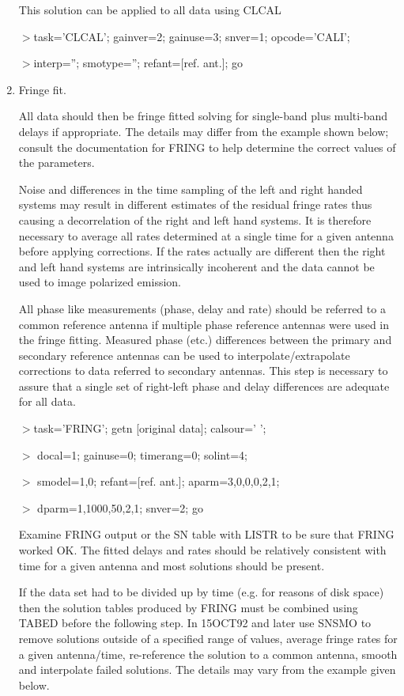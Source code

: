 \begin{enumerate}
  This solution can be applied to all data using CLCAL
\par\noindent
$>$task='CLCAL'; gainver=2; gainuse=3; snver=1; opcode='CALI';
\par\noindent
$>$interp=''; smotype=''; refant=[ref. ant.]; go


\item Fringe fit.

   All data should then be fringe fitted solving for single-band plus
multi-band delays if appropriate.  The details may differ from the
example shown below; consult the documentation for FRING to help
determine the correct values of the parameters.


   Noise and differences in the time sampling of the left and right
handed systems may result in different estimates of the residual
fringe rates thus
causing a decorrelation of the right and left hand systems.  It is
therefore necessary to average all rates determined at a single time
for a given antenna before applying corrections.  If the
rates actually are different then the right and left hand systems are
intrinsically incoherent and the data cannot be used to image
polarized emission.

   All phase like measurements (phase, delay and rate) should be
referred to a common reference antenna if multiple phase reference
antennas were used in the fringe fitting.  Measured phase (etc.)
differences between the primary and secondary reference antennas can
be used to interpolate/extrapolate corrections to data referred to
secondary antennas.  This step is necessary to assure that a single
set of right-left phase and delay differences are adequate for all
data.

\par\noindent
$>$task='FRING'; getn [original data]; calsour=' ';
\par\noindent
$>$ docal=1; gainuse=0; timerang=0; solint=4;
\par\noindent
$>$ smodel=1,0; refant=[ref. ant.]; aparm=3,0,0,0,2,1;
\par\noindent
$>$ dparm=1,1000,50,2,1; snver=2; go

   Examine FRING output or the SN table with LISTR to be sure that
FRING worked OK.  The fitted delays and rates should be relatively
consistent with time for a given antenna and most solutions should be
present.

   If the data set had to be divided up by time (e.g. for reasons of
disk space) then the solution tables produced by FRING must be
combined using TABED before the following step.
In 15OCT92 and later use SNSMO to remove solutions outside of a
specified range of values, average fringe rates for a given
antenna/time, re-reference the solution to a common
antenna, smooth and interpolate failed solutions.  The details may
vary from the example given below.


\end{enumerate}
